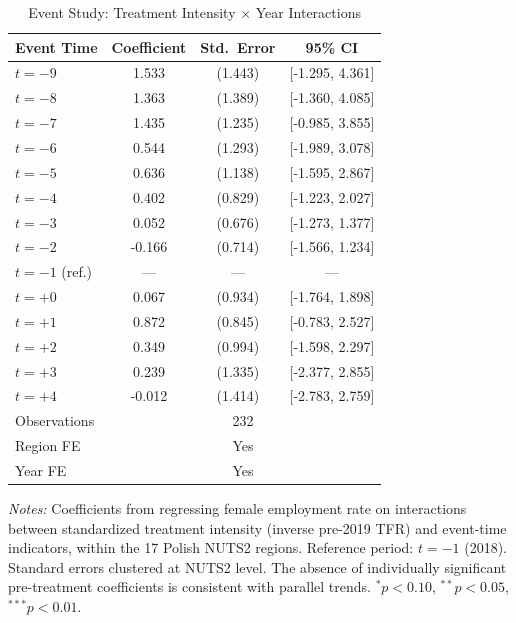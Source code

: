 \begin{table}[htbp]
\centering
\caption{Event Study: Treatment Intensity $\times$ Year Interactions}
\label{tab:event_study}
\small
\begin{tabular}{lccc}
\toprule
Event Time & Coefficient & Std.\ Error & 95\% CI \\
\midrule
$t = -9$ & 1.533 & (1.443) & [-1.295, 4.361] \\
$t = -8$ & 1.363 & (1.389) & [-1.360, 4.085] \\
$t = -7$ & 1.435 & (1.235) & [-0.985, 3.855] \\
$t = -6$ & 0.544 & (1.293) & [-1.989, 3.078] \\
$t = -5$ & 0.636 & (1.138) & [-1.595, 2.867] \\
$t = -4$ & 0.402 & (0.829) & [-1.223, 2.027] \\
$t = -3$ & 0.052 & (0.676) & [-1.273, 1.377] \\
$t = -2$ & -0.166 & (0.714) & [-1.566, 1.234] \\
$t = -1$ (ref.) & --- & --- & --- \\
$t = +0$ & 0.067 & (0.934) & [-1.764, 1.898] \\
$t = +1$ & 0.872 & (0.845) & [-0.783, 2.527] \\
$t = +2$ & 0.349 & (0.994) & [-1.598, 2.297] \\
$t = +3$ & 0.239 & (1.335) & [-2.377, 2.855] \\
$t = +4$ & -0.012 & (1.414) & [-2.783, 2.759] \\
\midrule
Observations & \multicolumn{3}{c}{232} \\
Region FE & \multicolumn{3}{c}{Yes} \\
Year FE & \multicolumn{3}{c}{Yes} \\
\bottomrule
\end{tabular}
\begin{tablenotes}[flushleft]
\small
\item \textit{Notes:} Coefficients from regressing female employment rate on interactions between standardized treatment intensity (inverse pre-2019 TFR) and event-time indicators, within the 17 Polish NUTS2 regions. Reference period: $t = -1$ (2018). Standard errors clustered at NUTS2 level. The absence of individually significant pre-treatment coefficients is consistent with parallel trends. $^{*}p<0.10$, $^{**}p<0.05$, $^{***}p<0.01$.
\end{tablenotes}
\end{table}
